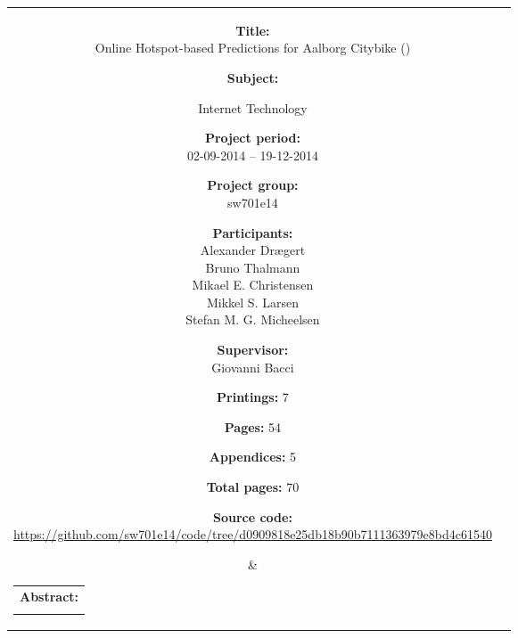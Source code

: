\begin{titlepage}
\begin{nopagebreak}
{\begin{tabular}{cc}
	\parbox{6cm}{
	\begin{description}
		\item { \textbf{Title:}}\\
			Online Hotspot-based Predictions for Aalborg Citybike (\projectname)
    		\item { \textbf{Subject:}}\\
			\raggedright Internet Technology
		\item { \textbf{Project period:}}\\
			02-09-2014 -- 19-12-2014
 		\hspace{4cm}
		\item { \textbf{Project group:}}\\
  			sw701e14
 		\hspace{4cm}
		\item {\textbf{Participants:}}\\
			Alexander Drægert\\
			Bruno Thalmann\\
			Mikael E. Christensen\\
			Mikkel S. Larsen\\
			Stefan M. G. Micheelsen
		\item { \textbf{Supervisor:}}\\
 			Giovanni Bacci
		\item { \textbf{Printings:} 7 }
		\item { \textbf{Pages:} 54 } 
		\item { \textbf{Appendices:} 5 }
		\item { \textbf{Total pages:} 70 }
		\item { \textbf{Source code:}\\ {\small \mbox{\footnotesize\url{https://github.com/sw701e14/code/tree/d0909818e25db18b90b7111363979e8bd4c61540}}}}
	\end{description}
	\vfill } &
	\parbox{8cm}{
  	\hfill 
  	\begin{tabular}{l}
  		{ \textbf{Abstract:}} \\
  		\fbox{
  		\parbox{8cm}{\smallskip
     		{\vfill{\footnotesize 
     		\smallskip}}}
     	}
   	\end{tabular}}
\end{tabular}
}%
\end{nopagebreak}
\end{titlepage}